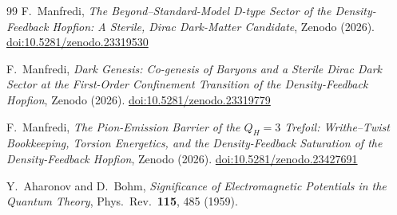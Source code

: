 \documentclass[11pt,a4paper]{article}
\begin{document}
\begin{thebibliography}{99}
F.~Manfredi,
\textit{The Beyond--Standard-Model D-type Sector of the Density-Feedback
Hopfion: A Sterile, Dirac Dark-Matter Candidate},
Zenodo (2026).
\href{https://doi.org/10.5281/zenodo.23319530}{doi:10.5281/zenodo.23319530}

F.~Manfredi,
\textit{Dark Genesis: Co-genesis of Baryons and a Sterile Dirac Dark Sector
at the First-Order Confinement Transition of the Density-Feedback Hopfion},
Zenodo (2026).
\href{https://doi.org/10.5281/zenodo.23319779}{doi:10.5281/zenodo.23319779}

F.~Manfredi,
\textit{The Pion-Emission Barrier of the $Q_H=3$ Trefoil: Writhe--Twist
Bookkeeping, Torsion Energetics, and the Density-Feedback Saturation of the
Density-Feedback Hopfion},
Zenodo (2026).
\href{https://doi.org/10.5281/zenodo.23427691}{doi:10.5281/zenodo.23427691}

Y.~Aharonov and D.~Bohm,
\textit{Significance of Electromagnetic Potentials in the Quantum Theory},
Phys.\ Rev.\ \textbf{115}, 485 (1959).

\end{thebibliography}
\end{document}

